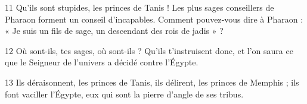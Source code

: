 
11 Qu’ils sont stupides, les princes de Tanis ! Les plus sages conseillers de Pharaon forment un conseil d’incapables. Comment pouvez-vous dire à Pharaon : « Je suis un fils de sage, un descendant des rois de jadis » ?

12 Où sont-ils, tes sages, où sont-ils ? Qu’ils t’instruisent donc, et l’on saura ce que le Seigneur de l’univers a décidé contre l’Égypte.

13 Ils déraisonnent, les princes de Tanis, ils délirent, les princes de Memphis ; ils font vaciller l’Égypte, eux qui sont la pierre d’angle de ses tribus.
